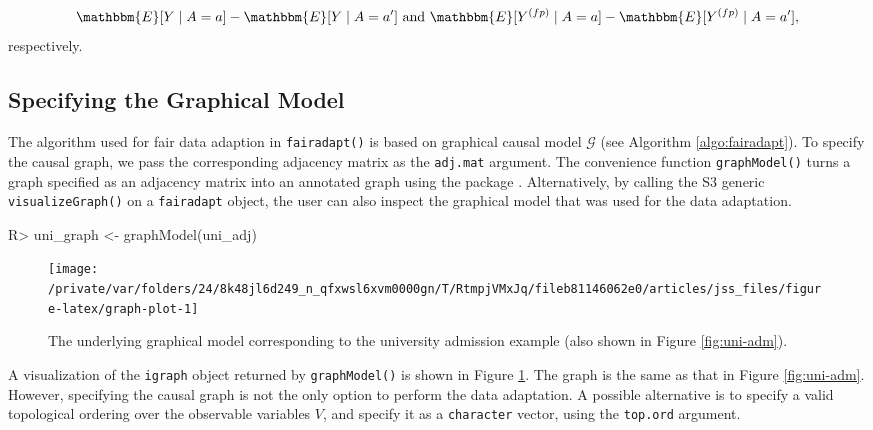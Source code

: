 \documentclass[
  nojss]{jss}
\begin{document}
\[\mathbbm{E}[Y \mid A = a] - \mathbbm{E}[Y \mid A = a'] \text{ and } \mathbbm{E}[ {Y}^{(fp)} \mid A = a] - \mathbbm{E}[ {Y}^{(fp)} \mid A = a'],\]
respectively.

\hypertarget{specifying-the-graphical-model}{%
\subsection{Specifying the Graphical
Model}\label{specifying-the-graphical-model}}

The algorithm used for fair data adaption in \texttt{fairadapt()} is
based on graphical causal model \(\mathcal{G}\) (see Algorithm
\ref{algo:fairadapt}). To specify the causal graph, we pass the
corresponding adjacency matrix as the \texttt{adj.mat} argument. The
convenience function \texttt{graphModel()} turns a graph specified as an
adjacency matrix into an annotated graph using the  package
\citep{csardi2006igraph}. Alternatively, by calling the S3 generic
\texttt{visualizeGraph()} on a \texttt{fairadapt} object, the user can
also inspect the graphical model that was used for the data adaptation.

\begin{CodeChunk}
\begin{CodeInput}
R> uni_graph <- graphModel(uni_adj)
\end{CodeInput}
\end{CodeChunk}

\begin{CodeChunk}
\begin{figure}

{\centering \texttt{[image: /private/var/folders/24/8k48jl6d249\_n\_qfxwsl6xvm0000gn/T/RtmpjVMxJq/fileb81146062e0/articles/jss\_files/figure-latex/graph-plot-1]} 

}

\caption{The underlying graphical model corresponding to the university admission example (also shown in Figure \ref{fig:uni-adm}).}\label{fig:graph-plot}
\end{figure}
\end{CodeChunk}

A visualization of the \texttt{igraph} object returned by
\texttt{graphModel()} is shown in Figure \ref{fig:graph-plot}. The graph
is the same as that in Figure \ref{fig:uni-adm}. However, specifying the
causal graph is not the only option to perform the data adaptation. A
possible alternative is to specify a valid topological ordering over the
observable variables \(V\), and specify it as a \texttt{character}
vector, using the \texttt{top.ord} argument.
\end{document}
